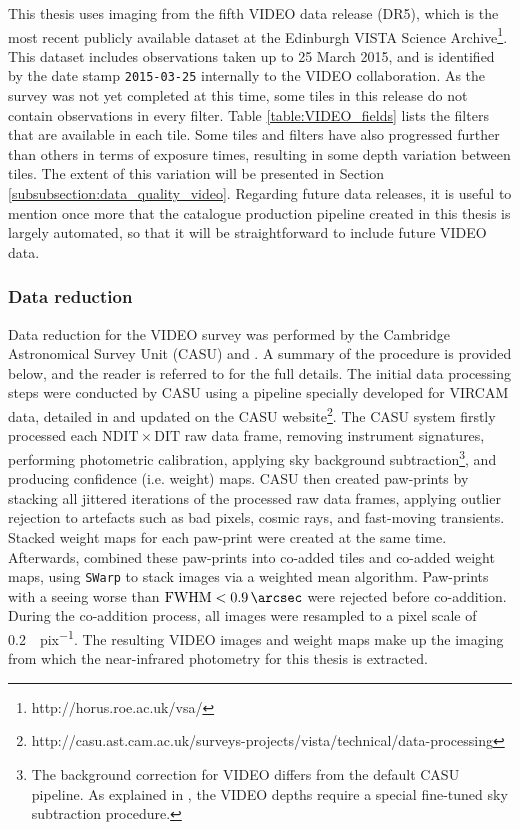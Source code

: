 This thesis uses imaging from the fifth VIDEO data release (DR5), which is the most recent publicly available dataset at the Edinburgh VISTA Science Archive\footnote{\color{blue} http://horus.roe.ac.uk/vsa/}. This dataset includes observations taken up to 25 March 2015, and is identified by the date stamp \texttt{2015-03-25} internally to the VIDEO collaboration. As the survey was not yet completed at this time, some tiles in this release do not contain observations in every filter. Table \ref{table:VIDEO_fields} lists the filters that are available in each tile. Some tiles and filters have also progressed further than others in terms of exposure times, resulting in some depth variation between tiles. The extent of this variation will be presented in Section \ref{subsubsection:data_quality_video}. Regarding future data releases, it is useful to mention once more that the \DESVIDEO catalogue production pipeline created in this thesis is largely automated, so that it will be straightforward to include future VIDEO data. \par

\subsubsection{Data reduction}\label{subsubsection:video_data_reduction}
Data reduction for the VIDEO survey was performed by the Cambridge Astronomical Survey Unit (CASU) and \cite{2013MNRAS.428.1281J}. A summary of the procedure is provided below, and the reader is referred to \cite{2013MNRAS.428.1281J} for the full details. The initial data processing steps were conducted by CASU using a pipeline specially developed for VIRCAM data, detailed in \cite{2004SPIE.5493..411I} and updated on the CASU website\footnote{\color{blue} http://casu.ast.cam.ac.uk/surveys-projects/vista/technical/data-processing}. The CASU system firstly processed each $\mathrm{NDIT} \times \mathrm{DIT}$ raw data frame, removing instrument signatures, performing photometric calibration, applying sky background subtraction\footnote{The background correction for VIDEO differs from the default CASU pipeline. As explained in \cite{2013MNRAS.428.1281J}, the VIDEO depths require a special fine-tuned sky subtraction procedure.}, and producing confidence (i.e. weight) maps. CASU then created paw-prints by stacking all jittered iterations of the processed raw data frames, applying outlier rejection to artefacts such as bad pixels, cosmic rays, and fast-moving transients. Stacked weight maps for each paw-print were created at the same time. Afterwards, \cite{2013MNRAS.428.1281J} combined these paw-prints into co-added tiles and co-added weight maps, using \texttt{SWarp} to stack images via a weighted mean algorithm. Paw-prints with a seeing worse than $\mathrm{FWHM}<\SI{0.9}{\arcsec}$ were rejected before co-addition. During the co-addition process, all images were resampled to a pixel scale of \SI{0.2}{\arcsec.pix^{-1}}. The resulting VIDEO images and weight maps make up the imaging from which the near-infrared photometry for this thesis is extracted. \par 



